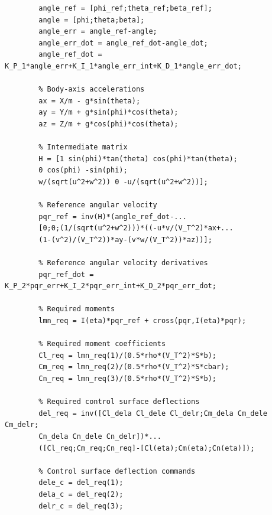 \documentclass[a4paper, 12pt]{report}
\begin{document}
	\begin{lstlisting}[style=matlabFrameTB, gobble=4]
		% Reference angle derivatives
		angle_ref = [phi_ref;theta_ref;beta_ref];
		angle = [phi;theta;beta];
		angle_err = angle_ref-angle;
		angle_err_dot = angle_ref_dot-angle_dot;
		angle_ref_dot = K_P_1*angle_err+K_I_1*angle_err_int+K_D_1*angle_err_dot;
		
		% Body-axis accelerations
		ax = X/m - g*sin(theta);
		ay = Y/m + g*sin(phi)*cos(theta);
		az = Z/m + g*cos(phi)*cos(theta);
		
		% Intermediate matrix
		H = [1 sin(phi)*tan(theta) cos(phi)*tan(theta);
		0 cos(phi) -sin(phi);
		w/(sqrt(u^2+w^2)) 0 -u/(sqrt(u^2+w^2))];
		
		% Reference angular velocity       
		pqr_ref = inv(H)*(angle_ref_dot-...
		[0;0;(1/(sqrt(u^2+w^2)))*((-u*v/(V_T^2)*ax+...
		(1-(v^2)/(V_T^2))*ay-(v*w/(V_T^2))*az))];
		
		% Reference angular velocity derivatives
		pqr_ref_dot = K_P_2*pqr_err+K_I_2*pqr_err_int+K_D_2*pqr_err_dot;
		
		% Required moments
		lmn_req = I(eta)*pqr_ref + cross(pqr,I(eta)*pqr);
		
		% Required moment coefficients
		Cl_req = lmn_req(1)/(0.5*rho*(V_T^2)*S*b);
		Cm_req = lmn_req(2)/(0.5*rho*(V_T^2)*S*cbar);
		Cn_req = lmn_req(3)/(0.5*rho*(V_T^2)*S*b);
		
		% Required control surface deflections
		del_req = inv([Cl_dela Cl_dele Cl_delr;Cm_dela Cm_dele Cm_delr;
		Cn_dela Cn_dele Cn_delr])*...
		([Cl_req;Cm_req;Cn_req]-[Cl(eta);Cm(eta);Cn(eta)]);
		
		% Control surface deflection commands
		dele_c = del_req(1);
		dela_c = del_req(2);
		delr_c = del_req(3);
	\end{lstlisting}
\end{document}
